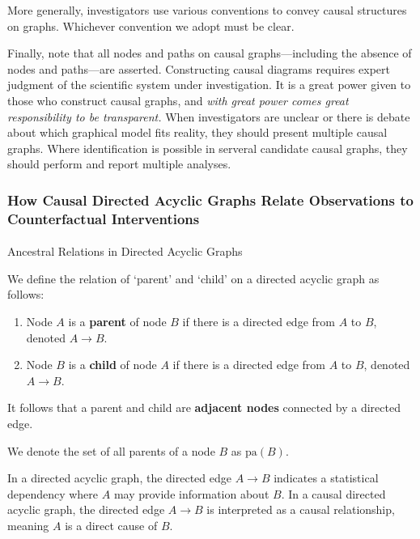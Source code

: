 \documentclass[
  single column]{article}
\makeatletter
\let\oldparagraph\paragraph
\renewcommand{\paragraph}{
    \@ifstar
      \xxxParagraphStar
      \xxxParagraphNoStar
  }
\newcommand{\xxxParagraphStar}[1]{\oldparagraph*{#1}\mbox{}}
\newcommand{\xxxParagraphNoStar}[1]{\oldparagraph{#1}\mbox{}}
\providecommand{\tightlist}{%
  \setlength{\itemsep}{0pt}\setlength{\parskip}{0pt}}\usepackage{longtable,booktabs,array}
\makeatother
\begin{document}
More generally, investigators use various conventions to convey causal
structures on graphs. Whichever convention we adopt must be clear.

Finally, note that all nodes and paths on causal graphs---including the
absence of nodes and paths---are asserted. Constructing causal diagrams
requires expert judgment of the scientific system under investigation.
It is a great power given to those who construct causal graphs, and
\emph{with great power comes great responsibility to be transparent.}
When investigators are unclear or there is debate about which graphical
model fits reality, they should present multiple causal graphs. Where
identification is possible in serveral candidate causal graphs, they
should perform and report multiple analyses.

\subsubsection{How Causal Directed Acyclic Graphs Relate Observations to
Counterfactual
Interventions}\label{how-causal-directed-acyclic-graphs-relate-observations-to-counterfactual-interventions}

\paragraph{Ancestral Relations in Directed Acyclic
Graphs}\label{ancestral-relations-in-directed-acyclic-graphs}

We define the relation of `parent' and `child' on a directed acyclic
graph as follows:

\begin{enumerate}
\def\labelenumi{\arabic{enumi}.}
\tightlist
\item
  Node \(A\) is a \textbf{parent} of node \(B\) if there is a directed
  edge from \(A\) to \(B\), denoted \(A \rightarrow B\).
\item
  Node \(B\) is a \textbf{child} of node \(A\) if there is a directed
  edge from \(A\) to \(B\), denoted \(A \rightarrow B\).
\end{enumerate}

It follows that a parent and child are \textbf{adjacent nodes} connected
by a directed edge.

We denote the set of all parents of a node \(B\) as \(\text{pa}(B)\).

In a directed acyclic graph, the directed edge \(A \rightarrow B\)
indicates a statistical dependency where \(A\) may provide information
about \(B\). In a causal directed acyclic graph, the directed edge
\(A \rightarrow B\) is interpreted as a causal relationship, meaning
\(A\) is a direct cause of \(B\).
\end{document}
